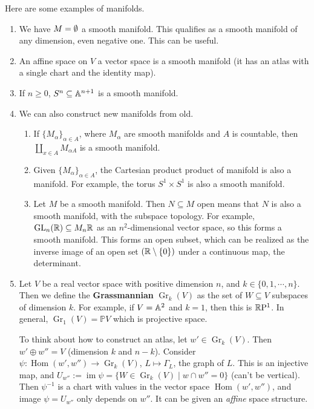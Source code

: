 \begin{example}
    Here are some examples of manifolds.
    \begin{enumerate}[label=(\arabic*)]
        \item We have $M= \emptyset$ a smooth manifold. This qualifies as a smooth manifold of any dimension, even negative one. This can be useful.
        \item An affine space on $V$ a vector space is a smooth manifold (it has an atlas with a single chart and the identity map).
        \item If $n\geq 0$, $S^n  \subseteq \mathbb{A}^{n+1}$ is a smooth manifold.
        \item We can also construct new manifolds from old.
            \begin{enumerate}
                \item If $\{ M_{\alpha }\} _{\alpha \in A}$, where $M_{\alpha }$ are smooth manifolds and $A$ is countable, then $\coprod _{x\in A} M _{\alpha A}$ is a smooth manifold.
                \item Given $\{M_{\alpha }\} _{\alpha \in A}$, the Cartesian product product of manifold is also a manifold. For example, the torus $S^1  \times  S^1 $ is also a smooth manifold.
                \item Let $M$ be a smooth manifold. Then $N \subseteq M$ open means that $N$ is also a smooth manifold, with the subspace topology. For example, $\operatorname{GL}_n (\mathbb{R}) \subseteq  M_n \mathbb{R}$ as an $n^2$-dimensional vector space, so this forms a smooth manifold. This forms an open subset, which can be realized as the inverse image of an open set $(\mathbb{R} \setminus \{0\} )$ under a continuous map, the determinant.
            \end{enumerate}
        \item Let $V$ be a real vector space with positive dimension $n$, and $k \in \{0,1,\cdots ,n\} $. Then we define the \textbf{Grassmannian} $\operatorname{Gr}_k(V)$ as the set of $W \subseteq V$ subspaces of dimension $k$. For example, if $V=\mathbb{A}^2$ and $k=1$, then this is $\mathbb{R} \mathrm P^1$. In general, $\operatorname{Gr}_1(V)=\mathbb P V$ which is projective space. 

            To think about how to construct an atlas, let $w' \in  \operatorname{Gr}_k(V)$. Then $w'\oplus w''=V$ (dimension $k$ and $n-k$). Consider $\psi \colon \operatorname{Hom}(w', w'') \to \operatorname{Gr}_k(V)$, $L \mapsto  \Gamma_L$, the graph of $L.$ This is an injective map, and $U_{w''}:=\operatorname{im}\psi = \{ W \in  \operatorname{Gr}_k(V)  \mid w \cap w''=0\} $ (can't be vertical). Then $\psi ^{-1}$ is a chart with values in the vector space $\operatorname{Hom}(w',w'')$, and image $\psi=U_{w''}$ only depends on $w''$. It can be given an \emph{affine} space structure.
    \end{enumerate}
\end{example}


